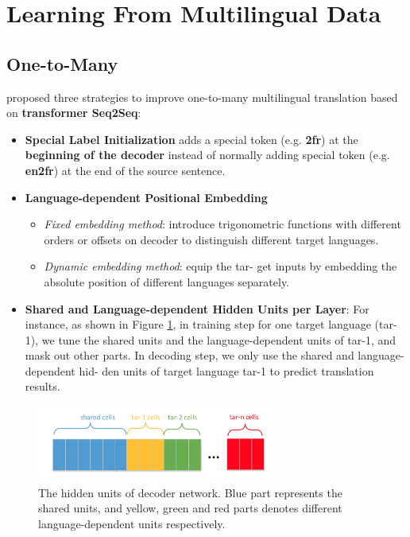 \documentclass[a3paper, 12pt]{book} %
\begin{document}
\citep{edunov2018understanding}

\section{Learning From Multilingual Data}
\subsection{One-to-Many}
\citep{wang2018three} proposed three strategies to improve one-to-many multilingual translation based on \textbf{transformer Seq2Seq}:
\begin{itemize}
	\item \textbf{Special Label Initialization} adds a special token (e.g. \textbf{2fr}) at the \textbf{beginning of the decoder} instead of normally adding special token (e.g. \textbf{en2fr}) at the end of the source sentence. 
	\item \textbf{Language-dependent Positional Embedding}
	\begin{itemize}
		\item \emph{Fixed embedding method}: introduce trigonometric functions with different orders or offsets on decoder to distinguish different target languages.
		\item \emph{Dynamic embedding method}: equip the tar- get inputs by embedding the absolute position of different languages separately.
	\end{itemize}
	\item \textbf{Shared and Language-dependent Hidden Units per Layer}: For instance, as shown in Figure \ref{fig:wang2018three_shared_layer}, in training step for one target language (tar-1), we tune the shared units and the language-dependent units of tar-1, and mask out other parts. In decoding step, we only use the shared and language-dependent hid- den units of target language tar-1 to predict translation results.
\end{itemize}

\begin{figure}[htpb]
	\centering
	\includegraphics[width=8cm]{figures/wang2018three.png}
	\caption{The hidden units of decoder network. Blue part represents the shared units, and yellow, green and red parts denotes different language-dependent units respectively.}
	\label{fig:wang2018three_shared_layer}
\end{figure}
\end{document}
